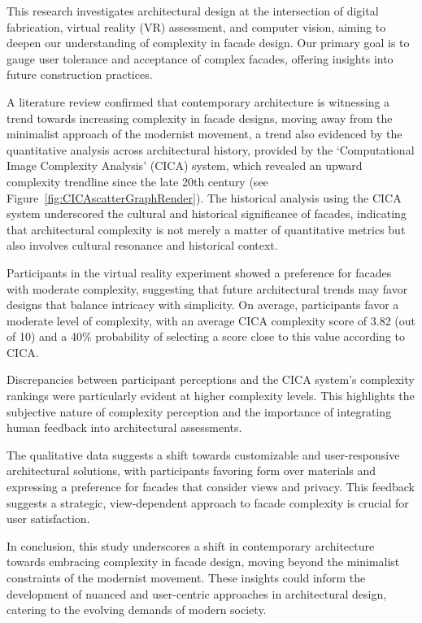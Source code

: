 


This research investigates architectural design at the intersection of digital fabrication, virtual reality (VR) assessment, and computer vision, aiming to deepen our understanding of complexity in facade design.
Our primary goal is to gauge user tolerance and acceptance of complex facades, offering insights into future construction practices.

A literature review confirmed that contemporary architecture is witnessing a trend towards increasing complexity in facade designs, moving away from the minimalist approach of the modernist movement, a trend also evidenced by the quantitative analysis across architectural history, provided by the `Computational Image Complexity Analysis' (CICA) system, which revealed an upward complexity trendline since the late 20th century (see Figure~\ref{fig:CICAscatterGraphRender}).
The historical analysis using the CICA system underscored the cultural and historical significance of facades, indicating that architectural complexity is not merely a matter of quantitative metrics but also involves cultural resonance and historical context.

Participants in the virtual reality experiment showed a preference for facades with moderate complexity, suggesting that future architectural trends may favor designs that balance intricacy with simplicity.
On average, participants favor a moderate level of complexity, with an average CICA complexity score of 3.82 (out of 10) and a 40\% probability of selecting a score close to this value according to CICA\@.

Discrepancies between participant perceptions and the CICA system's complexity rankings were particularly evident at higher complexity levels.
This highlights the subjective nature of complexity perception and the importance of integrating human feedback into architectural assessments.

The qualitative data suggests a shift towards customizable and user-responsive architectural solutions, with participants favoring form over materials and expressing a preference for facades that consider views and privacy.
This feedback suggests a strategic, view-dependent approach to facade complexity is crucial for user satisfaction.

In conclusion, this study underscores a shift in contemporary architecture towards embracing complexity in facade design, moving beyond the minimalist constraints of the modernist movement.
These insights could inform the development of nuanced and user-centric approaches in architectural design, catering to the evolving demands of modern society.
